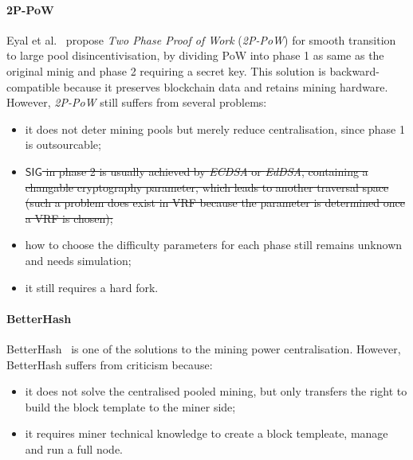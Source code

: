 \paragraph{\textbf{2P-PoW}}
Eyal et al.~\cite{2P-PoW} propose \textit{Two Phase Proof of Work} (\textit{2P-PoW}) for smooth transition to large pool disincentivisation, by dividing PoW into phase 1 as same as the original minig and phase 2 requiring a secret key.
This solution is backward-compatible because it preserves blockchain data and retains mining hardware. 
However, \textit{2P-PoW} still suffers from several problems:
\begin{itemize}
\renewcommand\labelitemi{$\bullet$}
    \item it does not deter mining pools but merely reduce centralisation, since phase 1 is outsourcable;
    \item \sout{$\mathsf{SIG}$ in phase 2 is usually achieved by \textit{ECDSA} or \textit{EdDSA}, containing a changable cryptography parameter, which leads to another traversal space (such a problem does exist in VRF because the parameter is determined once a VRF is chosen);} 
    \item how to choose the difficulty parameters for each phase still remains unknown and needs simulation;
    \item it still requires a hard fork.
\end{itemize}

\paragraph{\textbf{BetterHash}}
BetterHash~\cite{draft-bip-BetterHash} is one of the solutions to the mining power centralisation.
However, BetterHash suffers from criticism because:
\begin{itemize}
\renewcommand\labelitemi{$\bullet$}
    \item it does not solve the centralised pooled mining, but only transfers the right to build the block template to the miner side;
    \item it requires miner technical knowledge to create a block templeate, manage and run a full node.
\end{itemize}
